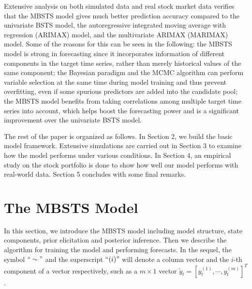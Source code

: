 \documentclass[twoside,11pt]{article}
\begin{document}
Extensive analysis on both simulated data and real stock market data verifies that the MBSTS model gives much better prediction accuracy compared to the univariate BSTS model, the autoregressive integrated moving average with regression (ARIMAX) model, and the multivariate ARIMAX (MARIMAX) model. Some of the reasons for this can be seen in the following: the MBSTS model is strong in forecasting since it incorporates information of different components in the target time series, rather than merely historical values of the same component; the Bayesian paradigm and the MCMC algorithm can perform variable selection at the same time during model training and thus prevent overfitting, even if some spurious predictors are added into the candidate pool; the MBSTS model benefits from taking correlations among multiple target time series into account, which helps boost the forecasting power and is a significant improvement over the univariate BSTS model.


The rest of the paper is organized as follows. In Section 2, we build the basic model framework. Extensive simulations are carried out in Section 3 to examine how the model performs under various conditions. In Section 4, an empirical study on the stock portfolio is done to show how well our model performs with real-world data. Section 5 concludes with some final remarks.


\section{The MBSTS Model}
In this section, we introduce the MBSTS model including model structure, state components, prior elicitation and posterior inference. Then we describe the algorithm for training the model and performing forecasts. In the sequel, the symbol $``\sim "$ and the superscript $``(i)"$ will denote a column vector and the $i$-th component of a vector respectively, such as a $m\times1$ vector $\tilde{y}_t=[y_t^{(1)},\cdots,y_t^{(m)}]^T$.
\end{document}
